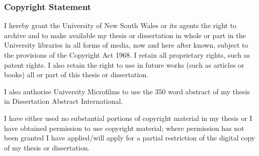 {\vspace{5mm}
\noindent{}


\cleardoublepage
\vspace*{1in}
\subsubsection*{Copyright Statement}

I hereby grant the University of New South Wales or its agents the right to
archive and to make available my thesis or dissertation in whole or part in the
University libraries in all forms of media, now and here after known, subject to
the provisions of the Copyright Act 1968. I retain all proprietary rights, such
as patent rights. I also retain the right to use in future works (such as
articles or books) all or part of this thesis or dissertation.

I also authorise University Microfilms to use the 350 word abstract of my thesis
in Dissertation Abstract International.

I have either used no substantial portions of copyright material in my thesis or
I have obtained permission to use copyright material; where permission has not
been granted I have applied/will apply for a partial restriction of the digital
copy of my thesis or dissertation.

\vspace{5mm}
\noindent{}


}
